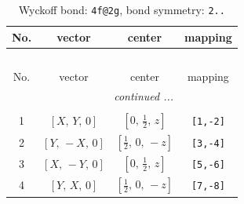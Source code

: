 \documentclass[fleqn,8pt]{jsarticle}
\begin{document}
\renewcommand{\arraystretch}{1.2}
\begin{longtable}{cccc}
\caption{Wyckoff bond: {\tt 4f@2g}, bond symmetry: {\tt 2..}}
 \\
 \hline \hline
No. & vector & center & mapping \\ \hline \endfirsthead

\multicolumn{3}{l}{\tablename\ \thetable{}} \\
 \hline \hline
No. & vector & center & mapping \\ \hline \endhead

 \hline \hline
\multicolumn{3}{r}{\footnotesize\it continued ...} \\ \endfoot

 \hline \hline
\multicolumn{3}{r}{} \\ \endlastfoot

1 & $\left[ X,\, Y,\, 0 \right]$ & $\left[ 0,\, \frac{1}{2},\, z \right]$ & {\tt [1,-2]} \\ \hline
2 & $\left[ Y,\, - X,\, 0 \right]$ & $\left[ \frac{1}{2},\, 0,\, - z \right]$ & {\tt [3,-4]} \\ \hline
3 & $\left[ X,\, - Y,\, 0 \right]$ & $\left[ 0,\, \frac{1}{2},\, z \right]$ & {\tt [5,-6]} \\ \hline
4 & $\left[ Y,\, X,\, 0 \right]$ & $\left[ \frac{1}{2},\, 0,\, - z \right]$ & {\tt [7,-8]} \\
\end{longtable}
\renewcommand{\arraystretch}{1.2}
\end{document}
